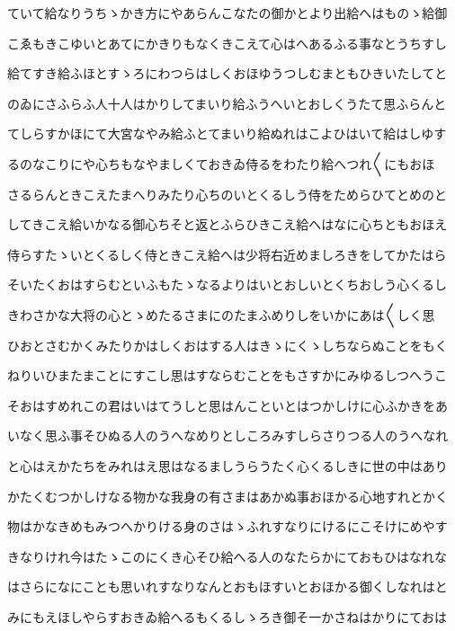 \documentclass[a4paper,11pt,landscape]{ltjtarticle}
\begin{document}
ていて給なりうちゝかき方にやあらんこなたの御かとより出給へはものゝ給御
\par\medskip
こゑもきこゆいとあてにかきりもなくきこえて心はへあるふる事なとうちすし
\par\medskip
給てすき給ふほとすゝろにわつらはしくおほゆうつしむまともひきいたしてと
\par\medskip
のゐにさふらふ人十人はかりしてまいり給ふうへいとおしくうたて思ふらんと
\par\medskip
てしらすかほにて大宮なやみ給ふとてまいり給ぬれはこよひはいて給はしゆす
\par\medskip
るのなこりにや心ちもなやましくておきゐ侍るをわたり給へつれ〱にもおほ
\par\medskip
さるらんときこえたまへりみたり心ちのいとくるしう侍をためらひてとめのと
\par\medskip
してきこえ給いかなる御心ちそと返とふらひきこえ給へはなに心ちともおほえ
\par\medskip
侍らすたゝいとくるしく侍ときこえ給へは少将右近めましろきをしてかたはら
\par\medskip
そいたくおはすらむといふもたゝなるよりはいとおしいとくちおしう心くるし
\par\medskip
きわさかな大将の心とゝめたるさまにのたまふめりしをいかにあは〱しく思
\par\medskip
ひおとさむかくみたりかはしくおはする人はきゝにくゝしちならぬことをもく
\par\medskip
ねりいひまたまことにすこし思はすならむことをもさすかにみゆるしつへうこ
\par\medskip
そおはすめれこの君はいはてうしと思はんこといとはつかしけに心ふかきをあ
\par\medskip
いなく思ふ事そひぬる人のうへなめりとしころみすしらさりつる人のうへなれ
\par\medskip
と心はえかたちをみれはえ思はなるましうらうたく心くるしきに世の中はあり
\par\medskip
かたくむつかしけなる物かな我身の有さまはあかぬ事おほかる心地すれとかく
\par\medskip
物はかなきめもみつへかりける身のさはゝふれすなりにけるにこそけにめやす
\par\medskip
きなりけれ今はたゝこのにくき心そひ給へる人のなたらかにておもひはなれな
\par\medskip
はさらになにことも思いれすなりなんとおもほすいとおほかる御くしなれはと
\par\medskip
みにもえほしやらすおきゐ給へるもくるしゝろき御そ一かさねはかりにておは
\par\medskip
\end{document}
